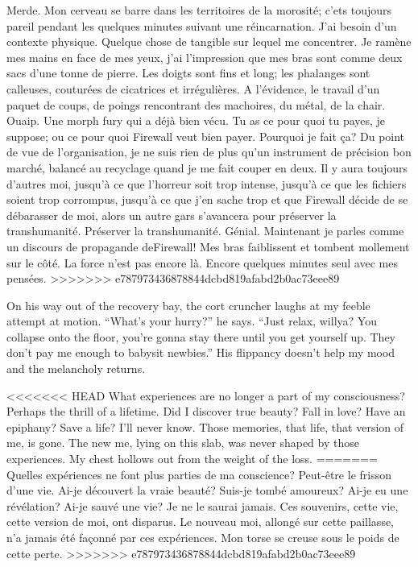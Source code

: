 Merde. Mon cerveau se barre dans les territoires de la morosité; c'ets toujours pareil pendant les quelques minutes suivant une réincarnation. J'ai besoin d'un contexte physique. Quelque chose de tangible sur lequel me concentrer. Je ramène mes mains en face de mes yeux, j'ai l'impression que mes bras sont comme deux sacs d'une tonne de pierre. Les doigts sont fins et long; les phalanges sont calleuses, couturées de cicatrices et irrégulières. A l'évidence, le travail d'un paquet de coups, de poings rencontrant des machoires, du métal, de la chair. Ouaip. Une morph fury qui a déjà bien vécu. Tu as ce pour quoi tu payes, je suppose; ou ce pour quoi Firewall veut bien payer. Pourquoi je fait ça? Du point de vue de l'organisation, je ne suis rien de plus qu'un instrument de précision bon marché, balancé au recyclage quand je me fait couper en deux. Il y aura toujours d'autres moi, jusqu'à ce que l'horreur soit trop intense, jusqu'à ce que les fichiers soient trop corrompus, jusqu'à ce que j'en sache trop et que Firewall décide de se débarasser de moi, alors un autre gars s'avancera pour préserver la transhumanité. Préserver la transhumanité. Génial. Maintenant je parles comme un discours de propagande deFirewall! Mes bras faiblissent et tombent mollement sur le côté. La force n'est pas encore là. Encore quelques minutes seul avec mes pensées. 
>>>>>>> e787973436878844dcbd819afabd2b0ac73eee89

On his way out of the recovery bay, the cort cruncher laughs at my feeble attempt at motion. ``What's your hurry?'' he says. ``Just relax, willya? You collapse onto the floor, you're gonna stay there until you get yourself up. They don't pay me enough to babysit newbies.'' His flippancy doesn't help my mood and the melancholy returns. 

<<<<<<< HEAD
What experiences are no longer a part of my consciousness? Perhaps the thrill of a lifetime. Did I discover true beauty? Fall in love? Have an epiphany? Save a life? I'll never know. Those memories, that life, that version of me, is gone. The new me, lying on this slab, was never shaped by those experiences. My chest hollows out from the weight of the loss. 
=======
Quelles expériences ne font plus parties de ma conscience? Peut-être le frisson d'une vie. Ai-je découvert la vraie beauté? Suis-je tombé amoureux? Ai-je eu une révélation? Ai-je sauvé une vie? Je ne le saurai jamais. Ces souvenirs, cette vie, cette version de moi, ont disparus. Le nouveau moi, allongé sur cette paillasse, n'a jamais été façonné par ces expériences. Mon torse se creuse sous le poids de cette perte. 
>>>>>>> e787973436878844dcbd819afabd2b0ac73eee89

